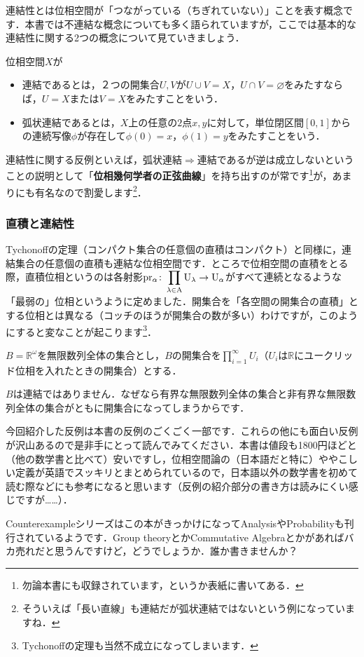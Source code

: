 連結性とは位相空間が「つながっている（ちぎれていない）」ことを表す概念です．本書では不連結な概念についても多く語られていますが，ここでは基本的な連結性に関する2つの概念について見ていきましょう．
\begin{defm}
位相空間$X$が
\begin{itemize}
\item 連結であるとは，２つの開集合$U,V$が$U\cup V=X$，$U\cap V=\varnothing$をみたすならば，$U=X$または$V=X$をみたすことをいう．
\item 弧状連結であるとは，$X$上の任意の$2$点$x,y$に対して，単位閉区間$[0,1]$からの連続写像$\phi$が存在して$\phi (0)=x$，$\phi (1)=y$をみたすことをいう．
\end{itemize}
\end{defm}
連結性に関する反例といえば，弧状連結$\Rightarrow$連結であるが逆は成立しないということの説明として「{\bf 位相幾何学者の正弦曲線}」を持ち出すのが常です\footnote{勿論本書にも収録されています，というか表紙に書いてある．}が，あまりにも有名なので割愛します\footnote{そういえば「長い直線」も連結だが弧状連結ではないという例になっていますね．}．
\subsubsection*{直積と連結性}
Tychonoffの定理（コンパクト集合の任意個の直積はコンパクト）と同様に，連結集合の任意個の直積も連結な位相空間です．ところで位相空間の直積をとる際，直積位相というのは各射影$\rm{pr_{\alpha}}\colon\displaystyle \prod_{\lambda\in A} U_\lambda\to U_\alpha$がすべて連続となるような「最弱の」位相というように定めました．開集合を「各空間の開集合の直積」とする位相とは異なる（コッチのほうが開集合の数が多い）わけですが，このようにすると変なことが起こります\footnote{Tychonoffの定理も当然不成立になってしまいます．}．
\begin{exm}
$B=\mathbb{R}^\omega$を無限数列全体の集合とし，$B$の開集合を$\displaystyle \prod_{i=1}^{\infty} U_i$（$U_i$は$\mathbb{R}$にユークリッド位相を入れたときの開集合）とする．
\end{exm}
$B$は連結ではありません．なぜなら有界な無限数列全体の集合と非有界な無限数列全体の集合がともに開集合になってしまうからです．

今回紹介した反例は本書の反例のごくごく一部です．これらの他にも面白い反例が沢山あるので是非手にとって読んでみてください．本書は値段も1800円ほどと（他の数学書と比べて）安いですし，位相空間論の（日本語だと特に）ややこしい定義が英語でスッキリとまとめられているので，日本語以外の数学書を初めて読む際などにも参考になると思います（反例の紹介部分の書き方は読みにくい感じですが……）．\par
Counterexampleシリーズはこの本がきっかけになってAnalysisやProbabilityも刊行されているようです．Group theoryとかCommutative Algebraとかがあればバカ売れだと思うんですけど，どうでしょうか．誰か書きませんか？
